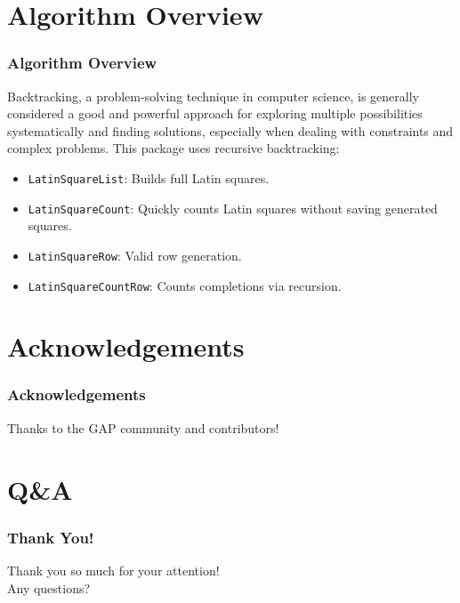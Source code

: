 \documentclass{beamer}
\begin{document}
\section{Algorithm Overview}
\begin{frame}
\frametitle{Algorithm Overview}
Backtracking, a problem-solving technique in computer science, is generally considered a good and powerful approach for exploring multiple possibilities systematically and finding solutions, especially when dealing with constraints and complex problems. 
This package uses recursive backtracking:
\begin{itemize}
  \item \texttt{LatinSquareList}: Builds full Latin squares.
  \item \texttt{LatinSquareCount}: Quickly counts Latin squares without saving generated squares.
  \item \texttt{LatinSquareRow}: Valid row generation.
  \item \texttt{LatinSquareCountRow}: Counts completions via recursion.
\end{itemize}
\end{frame}


\section{Acknowledgements}
\begin{frame}
\frametitle{Acknowledgements}
Thanks to the GAP community and contributors!
\end{frame}

\section{Q\&A}
\begin{frame}
	\frametitle{Thank You!}
	\centering
	\Large Thank you so much for your attention!\\[1em]
	\Large Any questions?
\end{frame}
\end{document}
